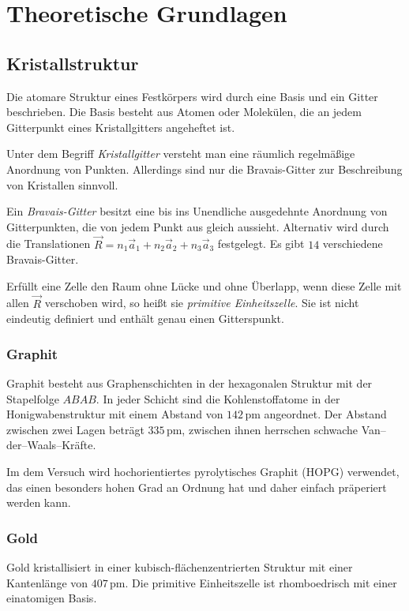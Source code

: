 \documentclass[12pt,a4paper]{scrartcl}
\numberwithin{equation}{section} %
\begin{document}
\clearpage
\hypertarget{theoretische-grundlagen}{%
\section{Theoretische Grundlagen}\label{theoretische-grundlagen}}

\hypertarget{kristallstruktur}{%
\subsection{Kristallstruktur}\label{kristallstruktur}}
Die atomare Struktur eines Festkörpers wird durch eine Basis und ein Gitter beschrieben. Die Basis besteht aus Atomen oder Molekülen, die an jedem Gitterpunkt eines Kristallgitters angeheftet ist.

Unter dem Begriff \textit{Kristallgitter} versteht man eine räumlich regelmäßige Anordnung von Punkten. Allerdings sind nur die Bravais-Gitter zur Beschreibung von Kristallen sinnvoll.

Ein \textit{Bravais-Gitter} besitzt eine bis ins Unendliche ausgedehnte Anordnung von Gitterpunkten, die von jedem Punkt aus gleich aussieht. Alternativ wird durch die Translationen $\vec{R} = n_1\vec{a}_1 + n_2\vec{a}_2 + n_3\vec{a}_3$ festgelegt. Es gibt $14$ verschiedene Bravais-Gitter.

Erfüllt eine Zelle den Raum ohne Lücke und ohne Überlapp, wenn diese Zelle mit allen $\vec{R}$
verschoben wird, so heißt sie \textit{primitive Einheitszelle}. Sie ist nicht eindeutig definiert und enthält genau einen Gitterspunkt.

\hypertarget{graphitstruktur}{%
\subsubsection{Graphit}\label{graphitstruktur}}
Graphit besteht aus Graphenschichten in der hexagonalen Struktur mit der Stapelfolge $ABAB$. In jeder Schicht sind die Kohlenstoffatome in der Honigwabenstruktur mit einem Abstand von $142\mathrm{\,pm}$ angeordnet. Der Abstand zwischen zwei Lagen beträgt $335\mathrm{\,pm}$, zwischen ihnen herrschen schwache Van--der--Waals--Kräfte.

Im dem Versuch wird hochorientiertes pyrolytisches Graphit (HOPG) verwendet, das einen besonders hohen Grad an Ordnung hat und daher einfach präperiert werden kann.

\hypertarget{goldstruktur}{%
\subsubsection{Gold}\label{goldstruktur}}
Gold kristallisiert in einer kubisch-flächenzentrierten Struktur mit einer Kantenlänge von $407\mathrm{\,pm}$. Die primitive Einheitszelle ist rhomboedrisch mit einer einatomigen Basis.
\end{document}
